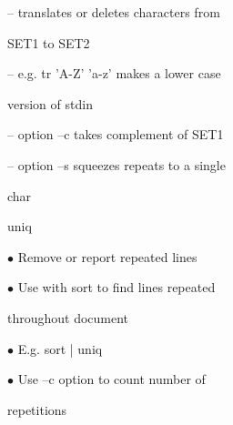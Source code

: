 \documentclass[a4paper,portrait,12pt]{article}
\begin{document}
\begin{flushleft}
-- translates or deletes characters from
\end{flushleft}


\begin{flushleft}
SET1 to SET2
\end{flushleft}


\begin{flushleft}
-- e.g. tr 'A-Z' 'a-z' makes a lower case
\end{flushleft}


\begin{flushleft}
version of stdin
\end{flushleft}


\begin{flushleft}
-- option --c takes complement of SET1
\end{flushleft}


\begin{flushleft}
-- option --s squeezes repeats to a single
\end{flushleft}


\begin{flushleft}
char
\end{flushleft}





\begin{flushleft}
\newpage
uniq
\end{flushleft}


\begin{flushleft}
$\bullet$ Remove or report repeated lines
\end{flushleft}


\begin{flushleft}
$\bullet$ Use with sort to find lines repeated
\end{flushleft}


\begin{flushleft}
throughout document
\end{flushleft}


\begin{flushleft}
$\bullet$ E.g. sort | uniq
\end{flushleft}


\begin{flushleft}
$\bullet$ Use --c option to count number of
\end{flushleft}


\begin{flushleft}
repetitions
\end{flushleft}
\end{document}
